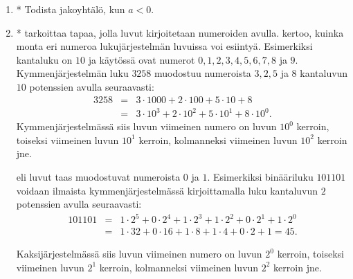 \begin{enumerate}
\item * %
Todista jakoyhtälö, kun $a<0$.

\item *
 tarkoittaa tapaa, jolla luvut kirjoitetaan numeroiden avulla.  kertoo, kuinka monta eri numeroa lukujärjestelmän luvuissa voi esiintyä. Esimerkiksi  kantaluku on $10$ ja käytössä ovat numerot $0,1,2,3,4,5,6,7,8$ ja $9$. Kymmenjärjestelmän luku $3258$ muodostuu numeroista $3,2,5$ ja $8$ kantaluvun $10$ potenssien avulla seuraavasti:
\begin{eqnarray*}
3258 &=&3\cdot 1000+2\cdot 100+5\cdot 10+8\\
&=& 3\cdot 10^3+2\cdot 10^2+5\cdot 10^1+8\cdot 10^0.
\end{eqnarray*}
Kymmenjärjestelmässä siis luvun viimeinen numero on luvun $10^0$ kerroin, toiseksi viimeinen luvun $10^1$ kerroin, kolmanneksi viimeinen luvun $10^2$ kerroin jne.

 eli  luvut taas muodostuvat numeroista $0$ ja $1$. Esimerkiksi binääriluku $101101$ voidaan ilmaista kymmenjärjestelmässä kirjoittamalla luku kantaluvun $2$ potenssien avulla seuraavasti:
\begin{eqnarray*}
101101&=&1\cdot2^5+0\cdot2^4+1\cdot2^3+1\cdot2^2+0\cdot2^1+1\cdot2^0 \\
&=& 1\cdot32+0\cdot16+1\cdot8+1\cdot4+0\cdot2+1=45.
\end{eqnarray*}

Kaksijärjestelmässä siis luvun viimeinen numero on luvun $2^0$ kerroin, toiseksi viimeinen luvun $2^1$ kerroin, kolmanneksi viimeinen luvun $2^2$ kerroin jne.


\end{enumerate}
